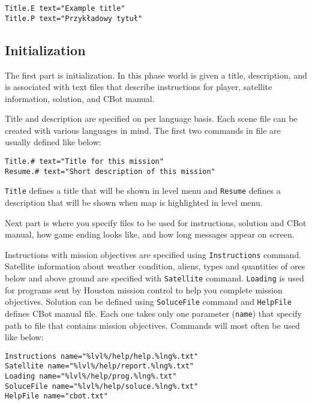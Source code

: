 \begin{verbatim}
Title.E text="Example title"
Title.P text="Przykładowy tytuł"
\end{verbatim}


\subsection{Initialization}

The first part is initialization. In this phase world is given a title, description, and is associated with text files that describe instructions for player, satellite information, solution, and CBot manual.

Title and description are specified on per language basis. Each scene file can be created with various languages in mind. The first two commands in file are usually defined like below:

\begin{verbatim}
Title.# text="Title for this mission"
Resume.# text="Short description of this mission"
\end{verbatim}

\texttt{Title} defines a title that will be shown in level menu and \texttt{Resume} defines a description that will be shown when map is highlighted in level menu.

Next part is where you specify files to be used for instructions, solution and CBot manual, how game ending looks like, and how long messages appear on screen.

Instructions with mission objectives are specified using \texttt{Instructions} command. Satellite information about weather condition, aliens, types and quantities of ores below and above ground are specified with \texttt{Satellite} command. \texttt{Loading} is used for programs sent by Houston mission control to help you complete mission objectives. Solution can be defined using \texttt{SoluceFile} command and \texttt{HelpFile} defines CBot manual file. Each one takes only one parameter (\texttt{name}) that specify path to file that contains mission objectives. Commands will most often be used like below:

\begin{verbatim}
Instructions name="%lvl%/help/help.%lng%.txt"
Satellite name="%lvl%/help/report.%lng%.txt"
Loading name="%lvl%/help/prog.%lng%.txt"
SoluceFile name="%lvl%/help/soluce.%lng%.txt"
HelpFile name="cbot.txt"
\end{verbatim}

